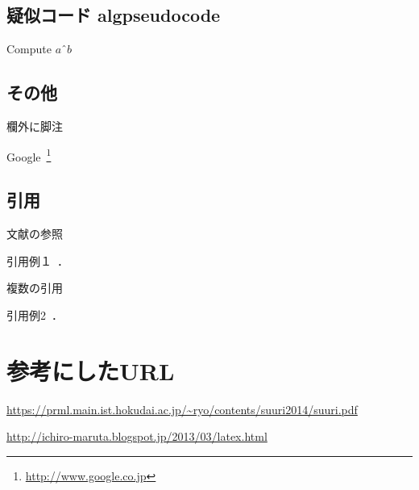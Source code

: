 \documentclass[a4paper,10pt]{ltjsarticle}
\begin{document}
    \subsection{疑似コード algpseudocode}
    \begin{algorithm}
        \caption{Compute $aˆb$}
        \begin{algorithmic}[1]
            \EndWhile
        \end{algorithmic}
    \end{algorithm}
    \subsection{その他}

    欄外に脚注

    Google~\footnote{ \url{ http://www.google.co.jp}}

    \subsection{引用}
    文献の参照

    引用例１~\cite{中居2006}．

    複数の引用

    引用例2~\cite{中居2006,ディープラーニング_CVIMチュートリアル,岩村_信学論LLAH2010}．


    \section{参考にしたURL}

    \url{ https://prml.main.ist.hokudai.ac.jp/~ryo/contents/suuri2014/suuri.pdf}

    \url{http://ichiro-maruta.blogspot.jp/2013/03/latex.html}
    

    {\normalsize %
    }
\end{document}
